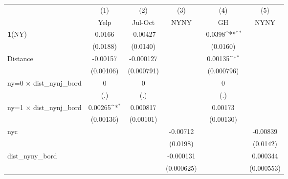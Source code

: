 {
\def\sym#1{\ifmmode^{#1}\else\(^{#1}\)\fi}
\begin{tabular}{l*{5}{c}}
\hline\hline
                    &\multicolumn{1}{c}{(1)}         &\multicolumn{1}{c}{(2)}         &\multicolumn{1}{c}{(3)}         &\multicolumn{1}{c}{(4)}         &\multicolumn{1}{c}{(5)}         \\
                    &        Yelp         &     Jul-Oct         &        NYNY         &          GH         &        NYNY         \\
\hline
\textbf{1}(NY)      &      0.0166         &    -0.00427         &                     &     -0.0398\sym{**} &                     \\
                    &    (0.0188)         &    (0.0140)         &                     &    (0.0160)         &                     \\
[1em]
Distance            &    -0.00157         &   -0.000127         &                     &     0.00135\sym{*}  &                     \\
                    &   (0.00106)         &  (0.000791)         &                     &  (0.000796)         &                     \\
[1em]
ny=0 $\times$ dist\_nynj\_bord&           0         &           0         &                     &           0         &                     \\
                    &         (.)         &         (.)         &                     &         (.)         &                     \\
[1em]
ny=1 $\times$ dist\_nynj\_bord&     0.00265\sym{*}  &    0.000817         &                     &     0.00173         &                     \\
                    &   (0.00136)         &   (0.00101)         &                     &   (0.00130)         &                     \\
[1em]
nyc                 &                     &                     &    -0.00712         &                     &    -0.00839         \\
                    &                     &                     &    (0.0198)         &                     &    (0.0142)         \\
[1em]
dist\_nyny\_bord      &                     &                     &   -0.000131         &                     &    0.000344         \\
                    &                     &                     &  (0.000625)         &                     &  (0.000553)         \\

\end{tabular}}

